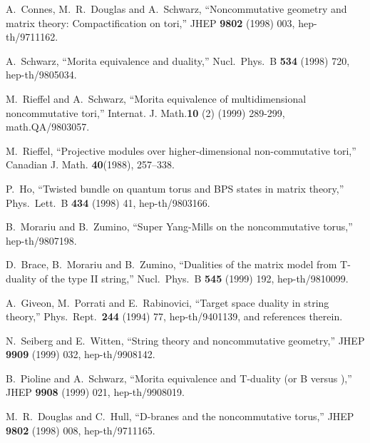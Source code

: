 \documentclass[a4paper,12pt]{article}
\begin{document}
\begin{thebibliography}{99}



A.~Connes, M.~R.~Douglas and A.~Schwarz,
``Noncommutative geometry and matrix theory: Compactification on tori,''
JHEP {\bf 9802} (1998) 003, 
hep-th/9711162.



A.~Schwarz, 
``Morita equivalence and duality,'' 
Nucl.\ Phys.\ B {\bf 534} (1998) 720, 
hep-th/9805034.



 M.~Rieffel and A.~Schwarz, 
``Morita equivalence of multidimensional noncommutative tori,'' 
Internat. J. Math.{\bf 10} (2) (1999) 289-299,
math.QA/9803057.



M.~Rieffel,
``Projective modules over higher-dimensional 
non-commutative tori,''
Canadian J. Math. {\bf 40}(1988), 257--338.



P.~Ho,
``Twisted bundle on quantum torus and BPS states in matrix theory,''
Phys.\ Lett.\ B {\bf 434} (1998) 41, 
hep-th/9803166.



B.~Morariu and B.~Zumino,
``Super Yang-Mills on the noncommutative torus,''
hep-th/9807198.



D.~Brace, B.~Morariu and B.~Zumino,
``Dualities of the matrix model from T-duality of the type II string,''
Nucl.\ Phys.\ B {\bf 545} (1999) 192, 
hep-th/9810099.



A.~Giveon, M.~Porrati and E.~Rabinovici,
``Target space duality in string theory,''
Phys.\ Rept.\  {\bf 244} (1994) 77,
hep-th/9401139, and references therein. 



  N.~Seiberg and E.~Witten, 
``String theory and noncommutative geometry,''
JHEP {\bf 9909} (1999) 032,
hep-th/9908142.



B.~Pioline and A.~Schwarz, 
``Morita equivalence and T-duality (or B versus \myHighlight{$\Theta$}\coordHE{}),'' 
JHEP {\bf 9908} (1999) 021, 
hep-th/9908019.



M.~R.~Douglas and C.~Hull,
``D-branes and the noncommutative torus,'' 
JHEP {\bf 9802} (1998) 008, 
hep-th/9711165.




\end{thebibliography}
\end{document}

